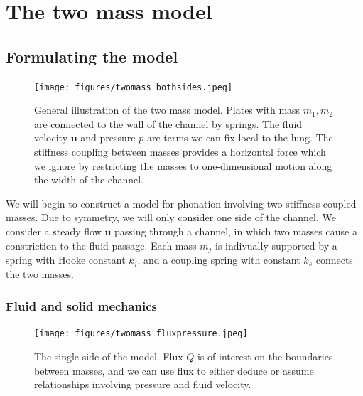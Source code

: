 


%


\chapter{The two mass model}
\label{cha:twomass}

\section{Formulating the model}

\begin{figure}[h!]
    \centering
    \texttt{[image: figures/twomass\_bothsides.jpeg]}
    \caption{General illustration of the two mass model. Plates with mass ${m_1},{m_2}$ are connected to the wall of the channel by springs.
    The fluid velocity $\mathbf{u}$ and pressure $p$ are terms we can fix local to the lung.
    The stiffness coupling between masses provides a horizontal force which we ignore by restricting the masses to one-dimensional motion along the width of the channel.}
    \label{fig:twomass_bothsides}
\end{figure}

We will begin to construct a model for phonation involving two stiffness-coupled masses.
Due to symmetry, we will only consider one side of the channel.
We consider a steady flow $\mathbf{u}$ passing through a channel,
in which two masses cause a constriction to the fluid passage.
Each mass $m_j$ is indivually supported by a spring with Hooke constant $k_j$,
and a coupling spring with constant $k_s$ connects the two masses.

\subsection{Fluid and solid mechanics}

\begin{figure}[h!]
	\centering
	\texttt{[image: figures/twomass\_fluxpressure.jpeg]}
	\caption{The single side of the model.
		Flux $Q$ is of interest on the boundaries between masses,
		and we can use flux to either deduce or assume relationships involving pressure and fluid velocity.
	}
	\label{fig:twomass_fluxpressure}
\end{figure}


